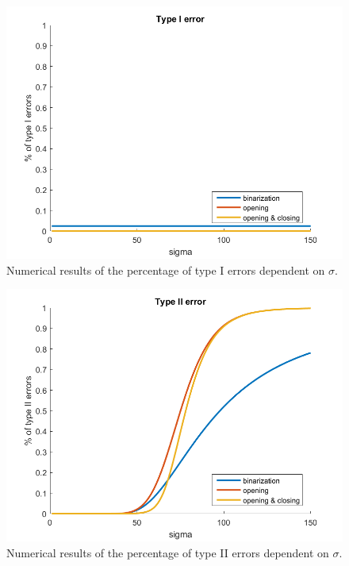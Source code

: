 \documentclass{beamer}
\begin{document}
\begin{frame}
	\begin{figure}[h]
		\includegraphics[width=0.6\linewidth]{Morphology/TypeIError}
		\caption[Type I error]{Numerical results of the percentage of type I errors dependent on $\sigma$.}
		\label{fig:TypeIError}
	\end{figure}
\end{frame}

\begin{frame}
	\begin{figure}[h]
		\includegraphics[width=0.6\linewidth]{Morphology/TypeIIError}
		\caption[Type II error]{Numerical results of the percentage of type II errors dependent on $\sigma$.}
		\label{fig:TypeIIError}
	\end{figure}
\end{frame}
\end{document}
